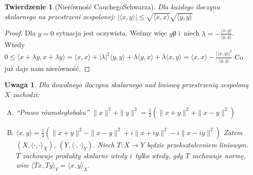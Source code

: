 \documentclass[11pt]{mwrep}
\renewcommand{\[}{\begin{equation}}
\renewcommand{\]}{\end{equation}}
\newcommand{\C}{{\ensuremath{\mathbb C}}}
\newtheorem{twr}[subsection]{Twierdzenie}%
\newtheorem{uwaga}[subsection]{Uwaga}
\newcounter{numer}
\begin{document}
\begin{twr}[Nierówność Cauchego\dywiz Schwarza] Dla każdego iloczynu skalarnego na przestrzeni zespolonej:
	$|\langle x,y \rangle| \le \sqrt{\langle x, x \rangle} \sqrt{\langle y, y \rangle}$
\end{twr}
\begin{proof}
	Dla $y=0$ sytuacja jest oczywista. Weźmy więc $y\not 0$ i~niech $\lambda = -\frac{\langle x,y \rangle}{\langle y,y \rangle}$.
	Wtedy $0\le\langle x+\lambda y,x+\lambda y \rangle = \langle x,x \rangle + |\lambda|^2 \langle y,y \rangle + \lambda\langle y,x \rangle + \overline{\lambda}
	\langle x,y \rangle = \langle x,x \rangle - \frac{|\langle x,y \rangle|^2}{\langle y,y \rangle}$
	Co już daje nam nierówność.
\end{proof}
\begin{uwaga}
	Dla dowolnego iloczynu skalarnego nad liniową przestrzenią  zespoloną $X$ zachodzi:
	\begin{enumerate}[(A)]
		\item ``Prawo równoległoboku'' $\|x\|^2+\|y\|^2 = \frac{1}{2}\left( \|x+y\|^2 + \|x-y\|^2 \right)$ 
		\item $\langle x,y \rangle = \frac{1}{4}\left( \|x+y\|^2 - \|x -  y\|^2  + i \|x+iy\|^2 - i\|x-iy\|^2\right)$
			Zatem $(X,\langle \cdot,\cdot \rangle_X)$, $(Y,\langle \cdot,\cdot \rangle_Y)$. Niech  $T\colon X\to Y$ będzie przekształceniem liniowym. 
			$T$ zachowuje produkty skalarne wtedy i~tylko wtedy, gdy $T$ zachowuje normę, wiec $\langle Tx,Ty \rangle_Y = \langle x,y \rangle_X$.
	\end{enumerate}
\end{uwaga}
\end{document}
